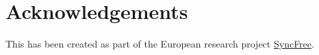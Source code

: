 \section{Acknowledgements}
This has been created as part of the European research project \href{https://syncfree.lip6.fr}{SyncFree}.
